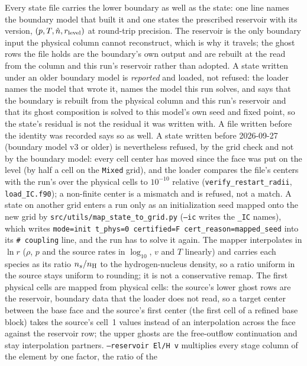 Every state file carries the lower boundary as well as the state: one line
names the boundary model that built it and one states the prescribed
reservoir with its version, $(p, T, \hat n, r_{\rm level})$ at round-trip
precision.  The reservoir is the only boundary input the physical column
cannot reconstruct, which is why it travels; the ghost rows the file holds
are the boundary's own output and are rebuilt at the read from the column and
this run's reservoir rather than adopted.  A state written under an older
boundary model is \emph{reported} and loaded, not refused: the loader names
the model that wrote it, names the model this run solves, and says that the
boundary is rebuilt from the physical column and this run's reservoir and
that its ghost composition is solved to this model's own seed and fixed
point, so the state's residual is not the residual it was written with.  A
file written before the identity was recorded says so as well.  A state
written before 2026-09-27 (boundary model v3 or older) is nevertheless
refused, by the grid check and not by the boundary model: every cell center
has moved since the face was put on the level (by half a cell on the
\texttt{Mixed} grid), and the loader
compares the file's centers with the run's over the physical cells to
$10^{-10}$ relative (\texttt{verify\_restart\_radii}, \texttt{load\_IC.f90});
a non-finite center is a mismatch and is refused, not a match.  A state on
another grid enters a run only as an initialization seed mapped onto the new
grid by \texttt{src/utils/map\_state\_to\_grid.py} (\texttt{--ic} writes the
\texttt{\_IC} names), which writes
\texttt{mode=init t\_phys=0 certified=F cert\_reason=mapped\_seed} into its
\texttt{\# coupling} line, and the run has to solve it again.  The mapper
interpolates in $\ln r$ ($\rho$, $p$ and the source rates in $\log_{10}$, $v$
and $T$ linearly) and carries each species as its ratio $n_s/n_{\rm H}$ to
the hydrogen-nucleus density, so a ratio uniform in the source stays uniform
to rounding; it is not a conservative remap.  The first physical cells are
mapped from physical cells: the source's lower ghost rows are the reservoir,
boundary data that the loader does not read, so a target center between the
base face and the source's first center (the first cell of a refined base
block) takes the source's cell~1 values instead of an interpolation across
the face against the reservoir row; the upper ghosts are the free-outflow
continuation and stay interpolation partners.  \texttt{--reservoir El/H v}
multiplies every stage column of the element by one factor, the ratio of the
